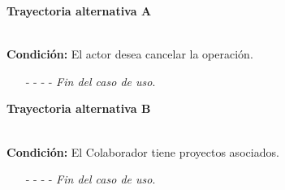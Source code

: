 \hypertarget{CU3-3:TAA}{\textbf{Trayectoria alternativa A}}\\
\noindent \textbf{Condición:} El actor desea cancelar la operación.
\begin{enumerate}
	\UCpaso[\UCactor] Solicita cancelar la operación oprimiendo el botón  de la ventana emergente.
	\UCpaso[\UCsist] Muestra la pantalla .
	\item[- -] - - {\em {Fin del caso de uso}}.%
\end{enumerate}		
	\hypertarget{CU3-3:TAB}{\textbf{Trayectoria alternativa B}}\\
	\noindent \textbf{Condición:} El Colaborador tiene proyectos asociados.
	\begin{enumerate}
		\UCpaso[\UCsist] Muestra el mensaje  en la pantalla .
		\item[- -] - - {\em {Fin del caso de uso}}.%
	\end{enumerate}

